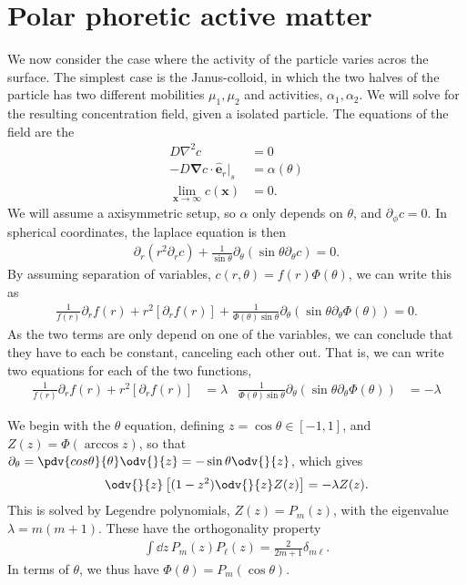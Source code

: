 \section{Polar phoretic active matter}

We now consider the case where the activity of the particle varies acros the surface.
The simplest case is the Janus-colloid, in which the two halves of the particle has two different mobilities $\mu_1, \mu_2$ and activities, $\alpha_1, \alpha_2$.
We will solve for the resulting concentration field, given a isolated particle.
The equations of the field are the
%
\begin{align}
    D\nabla^2 c & = 0\\
    -D \bm \nabla c \cdot \hat{ \bm e}_r|_s &= \alpha(\theta)\\
    \lim_{\bm x \rightarrow \infty} c(\bm x) &= 0.
\end{align}
%
We will assume a axisymmetric setup, so $\alpha$ only depends on $\theta$, and $\partial_\phi c = 0$.
In spherical coordinates, the laplace equation is then
%
\begin{align}
    \partial_r \left( r^2 \partial_r c \right) + \frac{1}{\sin \theta} \partial_\theta \left( \sin\theta \partial_\theta c \right) = 0.
\end{align}
%
By assuming separation of variables, $c(r, \theta) = f(r) \Phi(\theta)$, we can write this as
%
\begin{align}
    \frac{1}{f(r)} \partial_r f(r) +  r^2 \left[\partial_r f(r)\right] 
    + 
    \frac{1}{\Phi(\theta)\sin\theta} \partial_\theta \left( \sin\theta \partial_\theta \Phi(\theta) \right)  
    = 0.
\end{align}
%
As the two terms are only depend on one of the variables, we can conclude that they have to each be constant, canceling each other out.
That is, we can write two equations for each of the two functions,
%
\begin{align}
    \frac{1}{f(r)} \partial_r f(r) +  r^2 \left[\partial_r f(r)\right] & = \lambda &
    \frac{1}{\Phi(\theta)\sin\theta} \partial_\theta \left( \sin\theta \partial_\theta \Phi(\theta) \right)  & = -\lambda
\end{align}

We begin with the $\theta$ equation, defining $z = \cos\theta \in [-1, 1]$, and $Z(z) = \Phi(\arccos z)$, so that $\partial_\theta = \pdv{cos\theta}{\theta} \odv{}{z} = - \sin \theta \odv{}{z}$, which gives
%
\begin{align}
    \odv{}{z}   \left[ (1 - z^2) \odv{}{z} Z(z) \right] = - \lambda Z(z).
\end{align}
%
This is solved by Legendre polynomials, $Z(z) = P_m(z)$, with the eigenvalue $\lambda = m(m+1)$.
These have the orthogonality property
\begin{align}
    \int \dd z \, P_m(z)P_\ell(z) = \frac{2}{2m + 1} \delta_{m\ell}.
\end{align}
%
In terms of $\theta$, we thus have $\Phi(\theta) = P_m(\cos\theta)$.

